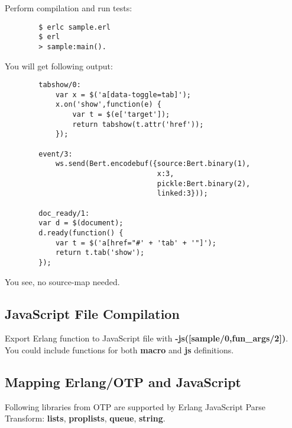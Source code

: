 \newpage
Perform compilation and run tests:

\vspace{1\baselineskip}
\begin{lstlisting}
        $ erlc sample.erl
        $ erl
        > sample:main().
\end{lstlisting}
\vspace{1\baselineskip}

You will get following output:

\vspace{1\baselineskip}
\begin{lstlisting}
        tabshow/0:
            var x = $('a[data-toggle=tab]');
            x.on('show',function(e) {
                var t = $(e['target']);
                return tabshow(t.attr('href'));
            });

        event/3:
            ws.send(Bert.encodebuf({source:Bert.binary(1),
                                    x:3,
                                    pickle:Bert.binary(2),
                                    linked:3}));

        doc_ready/1:
        var d = $(document);
        d.ready(function() {
            var t = $('a[href="#' + 'tab' + '"]');
            return t.tab('show');
        });
\end{lstlisting}
\vspace{1\baselineskip}

You see, no source-map needed.

\subsection{JavaScript File Compilation}
Export Erlang function to JavaScript file with {\bf -js([sample/0,fun\_{args}/2])}.
You could include functions for both {\bf macro} and {\bf js} definitions.

\subsection{Mapping Erlang/OTP and JavaScript}
Following libraries from OTP are supported by Erlang JavaScript Parse Transform: 
{\bf lists}, {\bf proplists}, {\bf queue}, {\bf string}.

